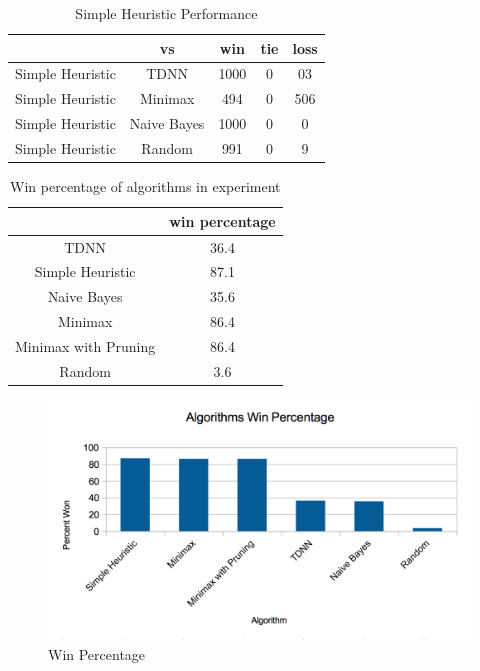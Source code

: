 \documentclass[12pt,letterpaper]{article}
\begin{document}
\begin{table}
\begin{center}
\begin{tabular}{|c||c|c|c|c|}
\hline
& vs & win & tie & loss\\
\hline \hline
Simple Heuristic & TDNN & 1000 & 0 & 03\\
\hline 
Simple Heuristic & Minimax & 494 & 0 & 506\\
\hline 
Simple Heuristic & Naive Bayes & 1000 & 0 & 0\\
\hline 
Simple Heuristic & Random & 991 & 0 & 9\\
\hline 
\end{tabular}
\end{center}
\caption{Simple Heuristic Performance}
\label{HeuristicTable}
\end{table}

\begin{table}
\begin{center}
\begin{tabular}{|c||c|}
\hline
& win percentage\\
\hline \hline
TDNN & 36.4\\
\hline 
Simple Heuristic & 87.1\\
\hline 
Naive Bayes & 35.6\\
\hline 
Minimax & 86.4\\
\hline 
Minimax with Pruning & 86.4\\
\hline 
Random & 3.6\\
\hline 
\end{tabular}
\end{center}
\caption{Win percentage of algorithms in experiment}
\label{WinPercentTable}
\end{table}

\begin{figure}
\begin{center}
\includegraphics[width=7in]{winpercent.png}
\end{center}
\caption{Win Percentage}
\label{WinGraph}
\end{figure}
\end{document}
